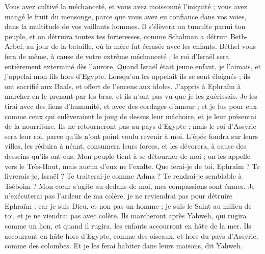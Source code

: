 \begin{multicols}{2}
Vous avez cultivé la méchanceté, et vous avez moissonné l’iniquité ; vous avez mangé le fruit du mensonge, parce que vous avez eu confiance dans vos voies, dans la multitude de vos vaillants hommes.
Il s'élèvera un tumulte parmi ton peuple, et on détruira toutes tes forteresses, comme Schalman a détruit Beth-Arbel, au jour de la bataille, où la mère fut écrasée avec les enfants.
Béthel vous fera de même, à cause de votre extrême méchanceté ; le roi d'Israël sera entièrement exterminé dès l’aurore.
\VerseOne{}Quand Israël était jeune enfant, je l'aimais, et j'appelai mon fils hors d'Egypte.
Lorsqu'on les appelait ils se sont éloignés ; ils ont sacrifié aux Baals, et offert de l’encens aux idoles.
J'appris à Ephraïm à marcher en le prenant par les bras, et ils n'ont pas vu que je les guérissais.
Je les tirai avec des liens d'humanité, et avec des cordages d'amour ; et je fus pour eux comme ceux qui enlèveraient le joug de dessus leur mâchoire, et je leur présentai de la nourriture.
Ils ne retourneront pas au pays d'Egypte ; mais le roi d'Assyrie sera leur roi, parce qu'ils n'ont point voulu revenir à moi.
L'épée fondra sur leurs villes, les réduira à néant, consumera leurs forces, et les dévorera, à cause des desseins qu’ils ont eus.
Mon peuple tient à se détourner de moi ; on les appelle vers le Très-Haut, mais aucun d'eux ne l'exalte.
Que ferai-je de toi, Ephraïm ? Te livrerais-je, Israël ? Te traiterai-je comme Adma ? Te rendrai-je semblable à Tséboim ? Mon cœur s’agite au-dedans de moi, mes compassions sont émues.
Je n'exécuterai pas l'ardeur de ma colère, je ne reviendrai pas pour détruire Ephraïm ; car je suis Dieu, et non pas un homme ; je suis le Saint au milieu de toi, et je ne viendrai pas avec colère.
Ils marcheront après Yahweh, qui rugira comme un lion, et quand il rugira, les enfants accourront en hâte de la mer.
Ils accourront en hâte hors d'Egypte, comme des oiseaux, et hors du pays d'Assyrie, comme des colombes. Et je les ferai habiter dans leurs maisons, dit Yahweh.

\end{multicols}
